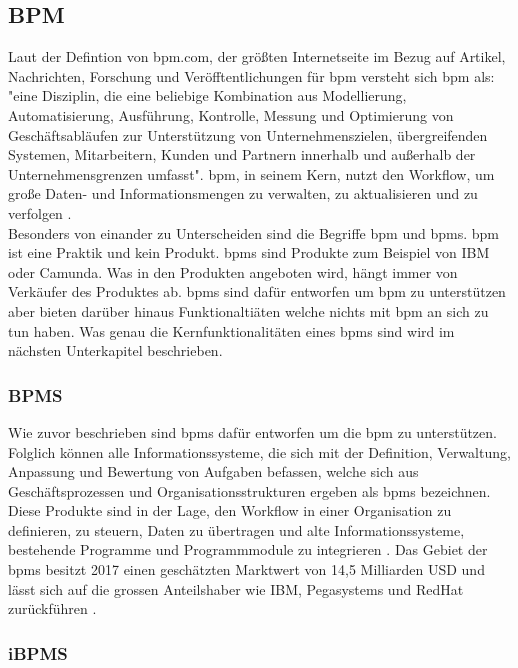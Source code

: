 \documentclass[a4paper, 12pt, twoside, headsepline=true]{scrartcl} %
\begin{document}
\subsection{BPM}
Laut der Defintion von bpm.com, der größten Internetseite im Bezug auf Artikel, Nachrichten, Forschung und Veröfftentlichungen für \ac{bpm} \cite{aboutbpmcom} versteht sich \ac{bpm} als: "eine Disziplin, die eine beliebige Kombination aus Modellierung, Automatisierung, Ausführung, Kontrolle, Messung und Optimierung von Geschäftsabläufen zur Unterstützung von Unternehmenszielen, übergreifenden Systemen, Mitarbeitern, Kunden und Partnern innerhalb und außerhalb der Unternehmensgrenzen umfasst"\cite{whatisbpm}. \ac{bpm}, in seinem Kern, nutzt den Workflow, um große Daten- und Informationsmengen zu verwalten, zu aktualisieren und zu verfolgen \cite{bpmofthings}. \\
Besonders von einander zu Unterscheiden sind die Begriffe \ac{bpm} und \ac{bpms}. \ac{bpm} ist eine Praktik und kein Produkt. \ac{bpms} sind Produkte zum Beispiel von IBM oder Camunda. Was in den Produkten angeboten wird, hängt immer von Verkäufer des Produktes ab. \ac{bpms} sind dafür entworfen um \ac{bpm} zu unterstützen aber bieten darüber hinaus Funktionaltiäten welche nichts mit \ac{bpm} an sich zu tun haben.  
Was genau die Kernfunktionalitäten eines \ac{bpms} sind wird im nächsten Unterkapitel beschrieben.
\subsubsection{BPMS}
Wie zuvor beschrieben sind \ac{bpms} dafür entworfen um die \ac{bpm} zu unterstützen. Folglich können alle Informationssysteme, die sich mit der Definition, Verwaltung, Anpassung und Bewertung von Aufgaben befassen, welche sich aus Geschäftsprozessen und Organisationsstrukturen ergeben als \ac{bpms} bezeichnen. Diese Produkte sind in der Lage, den Workflow in einer Organisation zu definieren, zu steuern, Daten zu übertragen und alte Informationssysteme, bestehende Programme und Programmmodule zu integrieren \cite{bpms}. Das Gebiet der \ac{bpms} besitzt 2017 einen geschätzten Marktwert von 14,5 Milliarden USD und lässt sich auf die grossen Anteilshaber wie IBM, Pegasystems und RedHat zurückführen \cite{bpmsmarket}.

\subsubsection{iBPMS}
\end{document}
